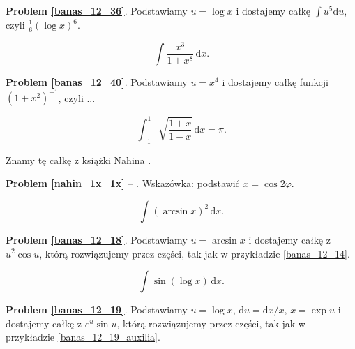 \textbf{Problem \ref{banas_12_36}}.
Podstawiamy $u = \log x$ i dostajemy całkę $\int u^5 \mathrm{d}u$, czyli $\frac 1 6 (\log x)^6$. 

\begin{problem_with_solution}
    \label{banas_12_40}%
    \begin{equation}
        \int \frac{x^3}{1+x^8} \, \mathrm{d}x.
    \end{equation}
\end{problem_with_solution}

\textbf{Problem \ref{banas_12_40}}.
Podstawiamy $u = x^4$ i dostajemy całkę funkcji $(1+x^2)^{-1}$, czyli ...

\begin{problem_with_solution}
    \label{nahin_1x_1x}%
    \begin{equation}
        \int_{-1}^1 \sqrt{\frac{1+x}{1-x}} \,\mathrm{d}x = \pi.
    \end{equation}
\end{problem_with_solution}

Znamy tę całkę z książki Nahina \cite{nahin15}.

\textbf{Problem \ref{nahin_1x_1x}} -- \cite[s. 115, 378]{nahin15}.
Wskazówka: podstawić $x = \cos 2 \varphi$.


\begin{problem_with_solution}
    \label{banas_12_18}%
    \begin{equation}
        \int (\arcsin x)^2 \,\mathrm{d}x.
    \end{equation}
\end{problem_with_solution}

\textbf{Problem \ref{banas_12_18}}.
Podstawiamy $u = \arcsin x$ i dostajemy całkę z $u^2 \cos u$, którą rozwiązujemy przez części, tak jak w przykładzie \ref{banas_12_14}.

\begin{problem_with_solution}
    \label{banas_12_19}%
    \begin{equation}
        \int \sin(\log x) \, \mathrm{d}x.
    \end{equation}
\end{problem_with_solution}

\textbf{Problem \ref{banas_12_19}}.
Podstawiamy $u = \log x$, $\mathrm{d} u = \mathrm{d} x / x$, $x = \exp u$ i dostajemy całkę z $e^u \sin u$, którą rozwiązujemy przez części, tak jak w przykładzie \ref{banas_12_19_auxilia}.

